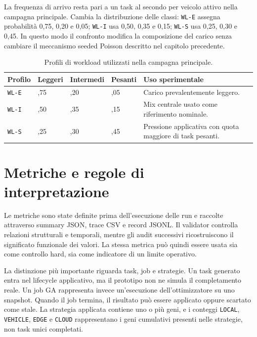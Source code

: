 La frequenza di arrivo resta pari a un task al secondo per veicolo attivo nella campagna principale. Cambia la distribuzione delle classi: \texttt{WL-E} assegna probabilità 0,75, 0,20 e 0,05; \texttt{WL-I} usa 0,50, 0,35 e 0,15; \texttt{WL-S} usa 0,25, 0,30 e 0,45. In questo modo il confronto modifica la composizione del carico senza cambiare il meccanismo seeded Poisson descritto nel capitolo precedente.

\begin{table}[htbp]
    \centering
    \caption{Profili di workload utilizzati nella campagna principale.}
    \label{tab:exp_workload}
    \small
    \begin{tabularx}{\textwidth}{
        >{\centering\arraybackslash}p{}
        >{\centering\arraybackslash}p{}
        >{\centering\arraybackslash}p{}
        >{\centering\arraybackslash}p{}
        >{\raggedright\arraybackslash}X
    }
        \toprule
        \textbf{Profilo} &
        \textbf{Leggeri} &
        \textbf{Intermedi} &
        \textbf{Pesanti} &
        \textbf{Uso sperimentale} \\
        \midrule
        \texttt{WL-E} & 0,75 & 0,20 & 0,05 & Carico prevalentemente leggero. \\
        \texttt{WL-I} & 0,50 & 0,35 & 0,15 & Mix centrale usato come riferimento nominale. \\
        \texttt{WL-S} & 0,25 & 0,30 & 0,45 & Pressione applicativa con quota maggiore di task pesanti. \\
        \bottomrule
    \end{tabularx}
\end{table}

\section{Metriche e regole di interpretazione}
\label{sec:exp_metriche}

Le metriche sono state definite prima dell'esecuzione delle run e raccolte attraverso summary JSON, trace CSV e record JSONL. Il validator controlla relazioni strutturali e temporali, mentre gli audit successivi ricostruiscono il significato funzionale dei valori. La stessa metrica può quindi essere usata sia come controllo hard, sia come indicatore di un limite operativo.

La distinzione più importante riguarda task, job e strategie. Un task generato entra nel lifecycle applicativo, ma il prototipo non ne simula il completamento reale. Un job GA rappresenta invece un'esecuzione dell'ottimizzatore su uno snapshot. Quando il job termina, il risultato può essere applicato oppure scartato come stale. La strategia applicata contiene uno o più geni, e i conteggi \texttt{LOCAL}, \texttt{VEHICLE}, \texttt{EDGE} e \texttt{CLOUD} rappresentano i geni cumulativi presenti nelle strategie, non task unici completati.

